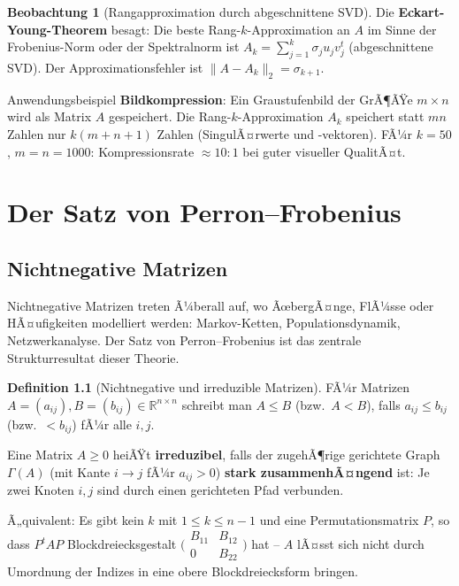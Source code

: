 ﻿\documentclass[a4paper,12pt]{report}
\theoremstyle{definition}
\newtheorem{definition}{Definition}
\newtheorem{beobachtung}{Beobachtung}
\begin{document}
\begin{beobachtung}[Rangapproximation durch abgeschnittene SVD]
    Die \textbf{Eckart-Young-Theorem} besagt: Die beste Rang-$k$-Approximation
    an $A$ im Sinne der Frobenius-Norm oder der Spektralnorm ist
    $A_k = \sum_{j=1}^k \sigma_j u_j v_j^t$ (abgeschnittene SVD).
    Der Approximationsfehler ist $\|A - A_k\|_2 = \sigma_{k+1}$.

    Anwendungsbeispiel \textbf{Bildkompression}: Ein Graustufenbild
    der GrÃ¶ÃŸe $m \times n$ wird als Matrix $A$ gespeichert.
    Die Rang-$k$-Approximation $A_k$ speichert statt $mn$ Zahlen
    nur $k(m + n + 1)$ Zahlen (SingulÃ¤rwerte und -vektoren).
    FÃ¼r $k = 50$, $m = n = 1000$: Kompressionsrate $\approx 10:1$
    bei guter visueller QualitÃ¤t.
\end{beobachtung}

\chapter{Der Satz von Perron--Frobenius}

\section{Nichtnegative Matrizen}

Nichtnegative Matrizen treten Ã¼berall auf, wo ÃœbergÃ¤nge, FlÃ¼sse oder
HÃ¤ufigkeiten modelliert werden: Markov-Ketten, Populationsdynamik,
Netzwerkanalyse. Der Satz von Perron--Frobenius ist das zentrale
Strukturresultat dieser Theorie.

\begin{definition}[Nichtnegative und irreduzible Matrizen]
    FÃ¼r Matrizen $A = (a_{ij}), B = (b_{ij}) \in \mathbb{R}^{n \times n}$
    schreibt man $A \leq B$ (bzw.\ $A < B$), falls $a_{ij} \leq b_{ij}$
    (bzw.\ $< b_{ij}$) fÃ¼r alle $i, j$.

    Eine Matrix $A \geq 0$ heiÃŸt \textbf{irreduzibel}, falls der
    zugehÃ¶rige gerichtete Graph $\Gamma(A)$ (mit Kante $i \to j$ fÃ¼r
    $a_{ij} > 0$) \textbf{stark zusammenhÃ¤ngend} ist: Je zwei Knoten
    $i, j$ sind durch einen gerichteten Pfad verbunden.

    Ã„quivalent: Es gibt kein $k$ mit $1 \leq k \leq n-1$ und eine Permutationsmatrix
    $P$, so dass $P^t A P$ Blockdreiecksgestalt
    $\bigl(\begin{smallmatrix} B_{11} & B_{12} \\ 0 & B_{22} \end{smallmatrix}\bigr)$
    hat -- $A$ lÃ¤sst sich nicht durch Umordnung der Indizes in eine
    obere Blockdreiecksform bringen.
\end{definition}
\end{document}
